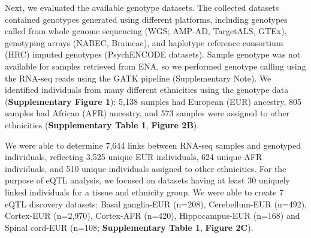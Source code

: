 Next, we evaluated the available genotype datasets. The collected datasets contained genotypes generated using different platforms, including genotypes called from whole genome sequencing (WGS; AMP-AD\cite{hodesAcceleratingMedicinesPartnership2016}, TargetALS\cite{prudencioDistinctBrainTranscriptome2015}, GTEx\cite{donovanCellularDeconvolutionGTEx2020}), genotyping arrays (NABEC\cite{DbGaPStudy}, Braineac\cite{ramasamyGeneticVariabilityRegulation2014}), and haplotype reference consortium (HRC)\cite{mccarthyReferencePanel642016} imputed genotypes (PsychENCODE datasets). Sample genotype was not available for samples retrieved from ENA, so we performed genotype calling using the RNA-seq reads using the GATK\cite{mckennaGenomeAnalysisToolkit2010} pipeline (Supplementary Note). We identified individuals from many different ethnicities using the genotype data (\textbf{Supplementary Figure 1}): 5,138 samples had European (EUR) ancestry, 805 samples had African (AFR) ancestry, and 573 samples were assigned to other ethnicities (\textbf{Supplementary Table 1}, \textbf{Figure 2B}). 

We were able to determine 7,644 links between RNA-seq samples and genotyped individuals, reflecting 3,525 unique EUR individuals, 624 unique AFR individuals, and 510 unique individuals assigned to other ethnicities. For the purpose of eQTL analysis, we focused on datasets having at least 30 uniquely linked individuals for a tissue and ethnicity group. We were able to create 7 eQTL discovery datasets: Basal ganglia-EUR (n=208), Cerebellum-EUR (n=492), Cortex-EUR (n=2,970), Cortex-AFR (n=420), Hippocampus-EUR (n=168) and Spinal cord-EUR (n=108; \textbf{Supplementary Table 1}, \textbf{Figure 2C}). 

